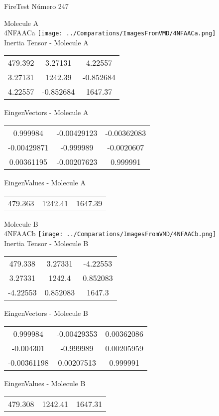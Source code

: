 \vtab[-2cm]
\begin{center}
{\large FireTest \tab Número 247}
\end{center}
\begin{multicols}{2}
\begin{center}

Molecule A \\ 
4NFAACa
\texttt{[image: ../Comparations/ImagesFromVMD/4NFAACa.png]}
\\
Inertia Tensor - Molecule A \\
\vtab

\begin{tabular}{|c c c|}
479.392	 & 	3.27131	 & 	4.22557	 \\
3.27131	 & 	1242.39	 & 	-0.852684	 \\
4.22557	 & 	-0.852684	 & 	1647.37
\end{tabular}

\vtab
 EingenVectors - Molecule A     \\
\vtab
\begin{tabular}{|c c c|}
0.999984	 & 	-0.00429123	 & 	-0.00362083	 \\
-0.00429871	 & 	-0.999989	 & 	-0.0020607	 \\
0.00361195	 & 	-0.00207623	 & 	0.999991
\end{tabular}

\vtab
 EingenValues - Molecule A     \\
\vtab
\begin{tabular}{|c c c|}
479.363	 & 	1242.41	 & 	1647.39	 \\
\end{tabular}
\columnbreak

Molecule B \\ 
4NFAACb
\texttt{[image: ../Comparations/ImagesFromVMD/4NFAACb.png]}
\\
Inertia Tensor - Molecule B \\
\vtab

\begin{tabular}{|c c c|}
479.338	 & 	3.27331	 & 	-4.22553	 \\
3.27331	 & 	1242.4	 & 	0.852083	 \\
-4.22553	 & 	0.852083	 & 	1647.3
\end{tabular}

\vtab
 EingenVectors - Molecule B     \\
\vtab
\begin{tabular}{|c c c|}
0.999984	 & 	-0.00429353	 & 	0.00362086	 \\
-0.004301	 & 	-0.999989	 & 	0.00205959	 \\
-0.00361198	 & 	0.00207513	 & 	0.999991
\end{tabular}

\vtab
 EingenValues - Molecule B     \\
\vtab
\begin{tabular}{|c c c|}
479.308	 & 	1242.41	 & 	1647.31	 \\
\end{tabular}

\end{center}
\end{multicols}
